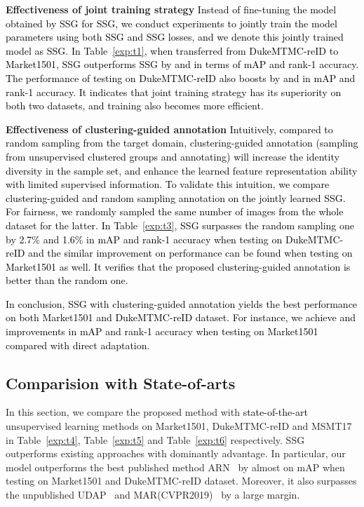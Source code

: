 \documentclass[10pt,twocolumn,letterpaper]{article}
\newcommand{\re}{\textcolor{black}}
\begin{document}
{\bf Effectiveness of joint training strategy} 
\re{Instead of fine-tuning the model obtained by SSG for SSG, we conduct experiments to jointly train the model parameters using both SSG and SSG losses, and we denote this jointly trained model as SSG. In Table~\ref{exp:t1}, when transferred from DukeMTMC-reID to Market1501, SSG outperforms SSG by  and  in terms of mAP and rank-1 accuracy. The performance of testing on DukeMTMC-reID also boosts by  and  in mAP and rank-1 accuracy. It indicates that joint training strategy has its superiority on both two datasets, and training also becomes more efficient.}


{\bf Effectiveness of clustering-guided annotation }
\re{Intuitively, compared to random sampling from the target domain, clustering-guided annotation (\ie sampling from unsupervised clustered groups and annotating) will increase the identity diversity in the sample set, and enhance the learned feature representation ability with limited supervised information. To validate this intuition, we compare clustering-guided and random sampling annotation on the jointly learned SSG. For fairness, we randomly sampled the same number of images from the whole dataset for the latter. In Table~\ref{exp:t3}, SSG surpasses the random sampling one by 2.7\% and 1.6\% in mAP and rank-1 accuracy when testing on DukeMTMC-reID and the similar improvement on performance can be found when testing on Market1501 as well. It verifies that the proposed clustering-guided annotation is better than the random one.} 

\re{In conclusion, SSG with clustering-guided annotation yields the best performance on both Market1501 and DukeMTMC-reID dataset. For instance, we achieve  and  improvements in mAP and rank-1 accuracy when testing on Market1501 compared with direct adaptation.}






\subsection{Comparision with State-of-arts}
In this section, we compare the proposed method with \re{state-of-the-art} unsupervised learning methods on Market1501, DukeMTMC-reID and MSMT17 in Table~\ref{exp:t4}, Table~\ref{exp:t5} and Table~\ref{exp:t6} respectively. SSG outperforms existing approaches with dominantly advantage. In particular, our model outperforms the best published method ARN~\cite{li2018adaptation} by almost  on mAP when testing on Market1501 and DukeMTMC-reID dataset. Moreover, it also surpasses the unpublished UDAP~\cite{deng2018image} and MAR(CVPR2019)~\cite{yu2019unsupervised} by a large margin.
\end{document}
